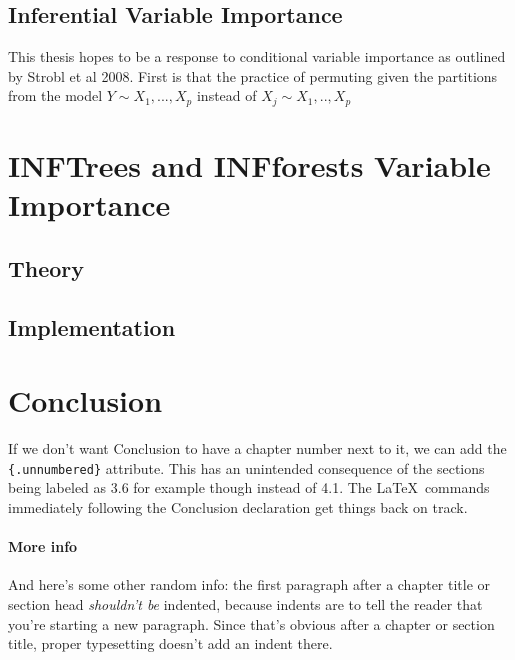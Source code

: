 \documentclass[12pt,twoside]{reedthesis}
\begin{document}
  \section{Inferential Variable
  Importance}\label{inferential-variable-importance}
  
  This thesis hopes to be a response to conditional variable importance as
  outlined by Strobl et al 2008. First is that the practice of permuting
  given the partitions from the model \(Y \sim X_1,...,X_p\) instead of
  \(X_j \sim X_1,..,X_p\)
  
  \chapter{INFTrees and INFforests Variable
  Importance}\label{inftrees-and-infforests-variable-importance}
  
  \section{Theory}\label{theory}
  
  \section{Implementation}\label{implementation}
  
  \chapter*{Conclusion}\label{conclusion}
  
  \setcounter{chapter}{4} \setcounter{section}{0}
  
  If we don't want Conclusion to have a chapter number next to it, we can
  add the \texttt{\{.unnumbered\}} attribute. This has an unintended
  consequence of the sections being labeled as 3.6 for example though
  instead of 4.1. The \LaTeX~commands immediately following the Conclusion
  declaration get things back on track.
  
  \subsubsection{More info}\label{more-info}
  
  And here's some other random info: the first paragraph after a chapter
  title or section head \emph{shouldn't be} indented, because indents are
  to tell the reader that you're starting a new paragraph. Since that's
  obvious after a chapter or section title, proper typesetting doesn't add
  an indent there.
  
\end{document}
